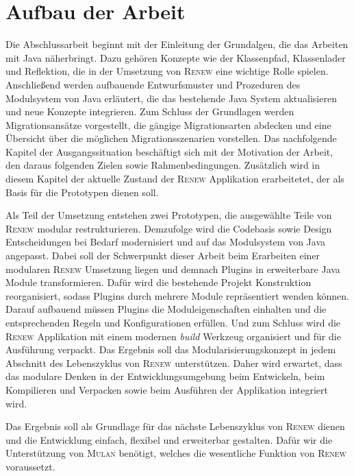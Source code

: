 \section{Aufbau der Arbeit} \label{sec:AdA}
	Die Abschlussarbeit beginnt mit der Einleitung der Grundalgen, die das Arbeiten mit Java näherbringt. Dazu gehören Konzepte wie der Klassenpfad, Klassenlader und Reflektion, die in der Umsetzung von \textsc{Renew} eine wichtige Rolle spielen. Anschließend werden aufbauende Entwurfsmuster und Prozeduren des Modulsystem von Java erläutert, die das bestehende Java System aktualisieren und neue Konzepte integrieren. Zum Schluss der Grundlagen werden Migrationsansätze vorgestellt, die gängige Migrationsarten abdecken und eine Übersicht über die möglichen Migrationsszenarien vorstellen.\newline 
	Das nachfolgende Kapitel der Ausgangssituation beschäftigt sich mit der Motivation der Arbeit, den daraus folgenden Zielen sowie Rahmenbedingungen. Zusätzlich wird in diesem Kapitel der aktuelle Zustand der \textsc{Renew} Applikation erarbeitetet, der als Basis für die Prototypen dienen soll. \bigbreak 

	Als Teil der Umsetzung entstehen zwei Prototypen, die ausgewählte Teile von \textsc{Renew} modular restrukturieren. Demzufolge wird die Codebasis sowie Design Entscheidungen bei Bedarf modernisiert und auf das Modulsystem von Java angepasst. Dabei soll der Schwerpunkt dieser Arbeit beim Erarbeiten einer modularen \textsc{Renew} Umsetzung liegen und demnach Plugins in erweiterbare Java Module transformieren.\newline
	Dafür wird die bestehende Projekt Konstruktion reorganisiert, sodass Plugins durch mehrere Module repräsentiert wenden können. Darauf aufbauend müssen Plugins die Moduleigenschaften einhalten und die entsprechenden Regeln und Konfigurationen erfüllen. Und zum Schluss wird die \textsc{Renew} Applikation mit einem modernen \textit{build} Werkzeug organisiert und für die Ausführung verpackt.\newline
	Das Ergebnis soll das Modularisierungskonzept in jedem Abschnitt des Lebenszyklus von \textsc{Renew} unterstützen. Daher wird erwartet, dass das modulare Denken in der Entwicklungsumgebung beim Entwickeln, beim Kompilieren und Verpacken sowie beim Ausführen der Applikation integriert wird. \bigbreak

	Das Ergebnis soll als Grundlage für das nächste Lebenszyklus von \textsc{Renew} dienen und die Entwicklung einfach, flexibel und erweiterbar gestalten. Dafür wir die Unterstützung von \textsc{Mulan} benötigt, welches die wesentliche Funktion von \textsc{Renew} voraussetzt. 
